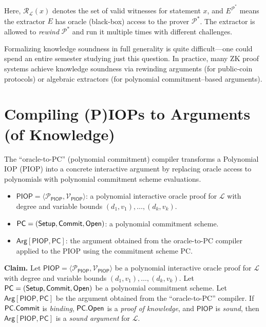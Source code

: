 \documentclass[11pt]{article}
\begin{document}
\medskip
Here, $\mathcal{R}_\mathcal{L}(x)$ denotes the set of valid witnesses for statement $x$,
and $E^{\mathcal{P}^*}$ means the extractor $E$ has oracle (black-box) access to the
prover $\mathcal{P}^*$.  The extractor is allowed to \emph{rewind} $\mathcal{P}^*$ and
run it multiple times with different challenges.

\begin{remark}
  Formalizing knowledge soundness in full generality is quite difficult---one could
  spend an entire semester studying just this question.  In practice, many ZK proof
  systems achieve knowledge soundness via rewinding arguments (for public-coin protocols)
  or algebraic extractors (for polynomial commitment--based arguments).
\end{remark}

\section{Compiling (P)IOPs to Arguments (of Knowledge)}

The ``oracle-to-PC'' (polynomial commitment) compiler transforms a Polynomial IOP (PIOP)
into a concrete interactive argument by replacing oracle access to polynomials with
polynomial commitment scheme evaluations.

\begin{tcolorbox}[colback=gray!5, colframe=gray!50, title=Setup]
  \begin{itemize}
    \item $\mathsf{PIOP} = \langle \mathcal{P}_{\mathsf{PIOP}}, \mathcal{V}_{\mathsf{PIOP}} \rangle$:
      a polynomial interactive oracle proof for $\mathcal{L}$ with degree and variable
      bounds $(d_1, v_1), \ldots, (d_k, v_k)$.
    \item $\mathsf{PC} = (\mathsf{Setup}, \mathsf{Commit}, \mathsf{Open})$: a polynomial commitment scheme.
    \item $\mathsf{Arg}[\mathsf{PIOP}, \mathsf{PC}]$: the argument obtained from the
      oracle-to-PC compiler applied to the PIOP using the commitment scheme PC.
  \end{itemize}
\end{tcolorbox}

\begin{claimbox}
  \textbf{Claim.}  Let $\mathsf{PIOP} = \langle \mathcal{P}_{\mathsf{PIOP}},
  \mathcal{V}_{\mathsf{PIOP}} \rangle$ be a polynomial interactive oracle proof for
  $\mathcal{L}$ with degree and variable bounds $(d_1, v_1), \ldots, (d_k, v_k)$.  Let
  $\mathsf{PC} = (\mathsf{Setup}, \mathsf{Commit}, \mathsf{Open})$ be a polynomial commitment scheme.  Let
  $\mathsf{Arg}[\mathsf{PIOP}, \mathsf{PC}]$ be the argument obtained from the
  ``oracle-to-PC'' compiler.  If $\mathsf{PC}.\mathsf{Commit}$ is \emph{binding}, $\mathsf{PC}.\mathsf{Open}$
  is a \emph{proof of knowledge}, and $\mathsf{PIOP}$ is \emph{sound}, then
  $\mathsf{Arg}[\mathsf{PIOP}, \mathsf{PC}]$ is a \emph{sound argument} for $\mathcal{L}$.
\end{claimbox}
\end{document}
